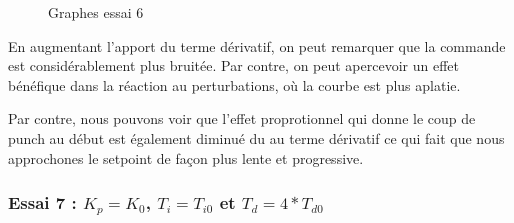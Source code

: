 \begin{figure}[H]
    \centering
    \caption{Graphes essai 6}
    \label{fig:essai-6}
\end{figure}

En augmentant l'apport du terme dérivatif, on peut remarquer que la commande
est considérablement plus bruitée. Par contre, on peut apercevoir un effet 
bénéfique dans la réaction au perturbations, où la courbe est plus aplatie.

Par contre, nous pouvons voir que l'effet proprotionnel qui donne le coup de punch au début est
également diminué du au terme dérivatif ce qui fait que nous approchones le setpoint de façon plus
lente et progressive.


\subsubsection{Essai 7 : $K_{p} = K_{0}$, $T_{i} = T_{i0}$ et $T_{d} = 4*T_{d0}$}

